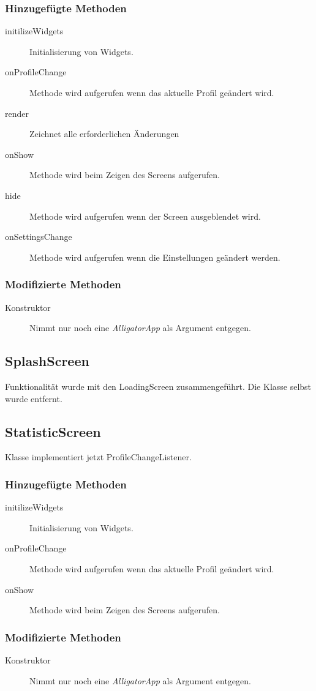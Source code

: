 \subsubsection{Hinzugefügte Methoden}
\begin{description}
\item[initilizeWidgets]
Initialisierung von Widgets.
\item[onProfileChange]
Methode wird aufgerufen wenn das aktuelle Profil geändert wird.

\item[render]
Zeichnet alle erforderlichen Änderungen
\item[onShow]
Methode wird beim Zeigen des Screens aufgerufen.
\item[hide]
Methode wird aufgerufen wenn der Screen ausgeblendet wird.
\item[onSettingsChange]
Methode wird aufgerufen wenn die Einstellungen geändert werden.


\end{description}

\subsubsection{Modifizierte Methoden}
\begin{description}
\item[Konstruktor]
Nimmt nur noch eine \emph{AlligatorApp} als Argument entgegen.

\end{description}

\subsection{SplashScreen}
Funktionalität wurde mit den LoadingScreen zusammengeführt. Die Klasse selbst wurde entfernt.



\subsection{StatisticScreen}
Klasse implementiert jetzt ProfileChangeListener.
\subsubsection{Hinzugefügte Methoden}
\begin{description}
\item[initilizeWidgets]
Initialisierung von Widgets.
\item[onProfileChange]
Methode wird aufgerufen wenn das aktuelle Profil geändert wird.

\item[onShow]
Methode wird beim Zeigen des Screens aufgerufen.



\end{description}

\subsubsection{Modifizierte Methoden}
\begin{description}
\item[Konstruktor]
Nimmt nur noch eine \emph{AlligatorApp} als Argument entgegen.

\end{description}

